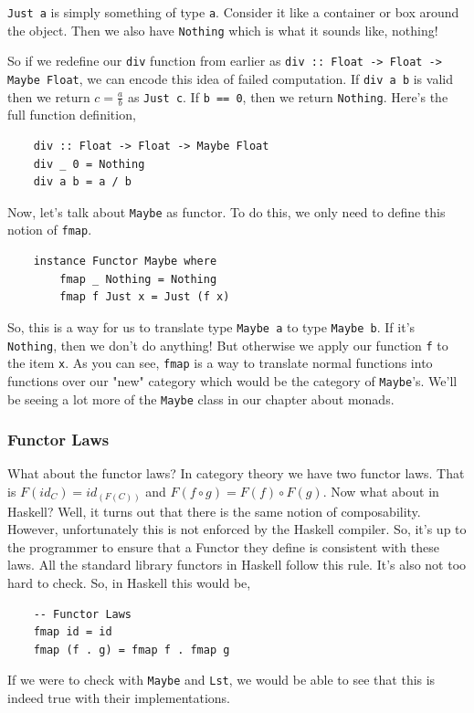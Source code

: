 \lstinline{Just a} is simply something of type \lstinline{a}. Consider it like a container or box around the object. Then we also have \lstinline{Nothing} which is what it sounds like, nothing! 

So if we redefine our \lstinline{div} function from earlier as  \lstinline{div :: Float -> Float -> Maybe Float}, we can encode this idea of failed computation. If \lstinline{div a b} is valid then we return $c = \frac{a}{b}$ as \lstinline{Just c}. If \lstinline{b == 0}, then we return \lstinline{Nothing}. Here's the full function definition,

\begin{lstlisting}
    div :: Float -> Float -> Maybe Float
    div _ 0 = Nothing
    div a b = a / b
\end{lstlisting}

Now, let's talk about \lstinline{Maybe} as functor. To do this, we only need to define this notion of \lstinline{fmap}.

\begin{lstlisting}
    instance Functor Maybe where
        fmap _ Nothing = Nothing
        fmap f Just x = Just (f x)
\end{lstlisting}

So, this is a way for us to translate type \lstinline{Maybe a} to type \lstinline{Maybe b}. If it's \lstinline{Nothing}, then we don't do anything! But otherwise we apply our function \lstinline{f} to the item \lstinline{x}.  As you can see, \lstinline{fmap} is a way to translate normal functions into functions over our "new" category which would be the category of \lstinline{Maybe}'s. We'll be seeing a lot more of the \lstinline{Maybe} class in our chapter about monads.

\subsubsection{Functor Laws} 

What about the functor laws? In category theory we have two functor laws. That is $F(id_C) = id_{(F(C))}$ and $F(f \circ g) = F(f) \circ F(g)$. Now what about in Haskell? Well, it turns out that there is the same notion of composability. However, unfortunately this is not enforced by the Haskell compiler. So, it's up to the programmer to ensure that a Functor they define is consistent with these laws. All the standard library functors in Haskell follow this rule. It's also not too hard to check. So, in Haskell this would be,

\begin{lstlisting}
    -- Functor Laws
    fmap id = id
    fmap (f . g) = fmap f . fmap g
\end{lstlisting}

If we were to check with \lstinline{Maybe} and \lstinline{Lst}, we would be able to see that this is indeed true with their implementations.





